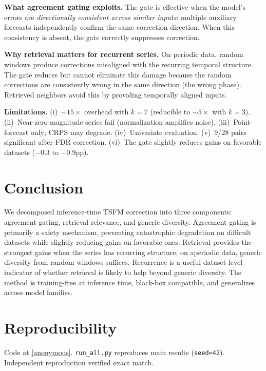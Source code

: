 \documentclass{article}
\begin{document}
\textbf{What agreement gating exploits.} The gate is effective when the model's errors are \emph{directionally consistent across similar inputs}: multiple auxiliary forecasts independently confirm the same correction direction. When this consistency is absent, the gate correctly suppresses correction.

\textbf{Why retrieval matters for recurrent series.} On periodic data, random windows produce corrections misaligned with the recurring temporal structure. The gate reduces but cannot eliminate this damage because the random corrections are consistently wrong in the same direction (the wrong phase). Retrieved neighbors avoid this by providing temporally aligned inputs.

\textbf{Limitations.} (i)~${\sim}15{\times}$ overhead with $k{=}7$ (reducible to ${\sim}5{\times}$ with $k{=}3$). (ii)~Near-zero-magnitude series fail (normalization amplifies noise). (iii)~Point-forecast only; CRPS may degrade. (iv)~Univariate evaluation. (v)~9/28 pairs significant after FDR correction. (vi)~The gate slightly reduces gains on favorable datasets ($-0.3$ to $-0.9$pp).

\section{Conclusion}

We decomposed inference-time TSFM correction into three components: agreement gating, retrieval relevance, and generic diversity. Agreement gating is primarily a safety mechanism, preventing catastrophic degradation on difficult datasets while slightly reducing gains on favorable ones. Retrieval provides the strongest gains when the series has recurring structure; on aperiodic data, generic diversity from random windows suffices. Recurrence is a useful dataset-level indicator of whether retrieval is likely to help beyond generic diversity. The method is training-free at inference time, black-box compatible, and generalizes across model families.

\section*{Reproducibility}
Code at \url{[anonymous]}. \texttt{run\_all.py} reproduces main results (\texttt{seed=42}). Independent reproduction verified exact match.
\end{document}
